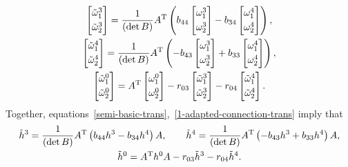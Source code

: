 \documentclass[pdftex]{sigma}
\numberwithin{equation}{section}
\theoremstyle{definition}
\begin{document}
\begin{gather}
\begin{bmatrix}
\tilde{\omega}^3_1
\vspace{1mm}\\
\tilde{\omega}^3_2
\end{bmatrix}
= \frac{1}{(\det B)} A^{\rm T} \left(b_{44}
\begin{bmatrix}
\omega^3_1
\vspace{1mm}\\
\omega^3_2
\end{bmatrix}
- b_{34}
\begin{bmatrix}
\omega^4_1
\vspace{1mm}\\
\omega^4_2
\end{bmatrix}
\right),
\nonumber
\\
\begin{bmatrix}
\tilde{\omega}^4_1
\vspace{1mm}\\
\tilde{\omega}^4_2
\end{bmatrix}
= \frac{1}{(\det B)} A^{\rm T} \left(-b_{43}
\begin{bmatrix}
\omega^3_1
\vspace{1mm}\\
\omega^3_2
\end{bmatrix}
+ b_{33}
\begin{bmatrix}
\omega^4_1
\vspace{1mm}\\
\omega^4_2
\end{bmatrix}
\right),
\nonumber
\\
\begin{bmatrix}
\tilde{\omega}^0_1
\vspace{1mm}\\
\tilde{\omega}^0_2
\end{bmatrix}
= A^{\rm T}
\begin{bmatrix}
\omega^0_1
\vspace{1mm}\\
\omega^0_2
\end{bmatrix}
- r_{03}
\begin{bmatrix}
\tilde{\omega}^3_1
\vspace{1mm}\\
\tilde{\omega}^3_2
\end{bmatrix}
- r_{04}
\begin{bmatrix}
\tilde{\omega}^4_1
\vspace{1mm}\\
\tilde{\omega}^4_2
\end{bmatrix}.
\label{1-adapted-connection-trans}
\end{gather}
Together, equations~\eqref{semi-basic-trans},~\eqref{1-adapted-connection-trans} imply that
\begin{gather}
\tilde{h}^3 = \frac{1}{(\det B)} A^{\rm T} \left(b_{44} h^3 - b_{34} h^4 \right) A,
\qquad
\tilde{h}^4 = \frac{1}{(\det B)} A^{\rm T} \left(-b_{43} h^3 + b_{33} h^4 \right) A,
\nonumber
\\
\tilde{h}^0 = A^{\rm T} h^0 A-r_{03} \tilde{h}^3 - r_{04} \tilde{h}^4.
\label{1-adapted-group-action}
\end{gather}
\end{document}
